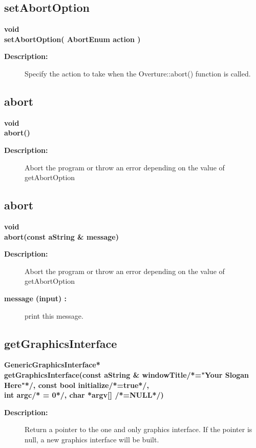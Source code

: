 \subsection{setAbortOption}
 
\begin{flushleft} \textbf{%
void  \\ 
\settowidth{\OvertureIncludeArgIndent}{setAbortOption(}%
setAbortOption( AbortEnum action )
}\end{flushleft}
\begin{description}
\item[{\bf Description:}] 
    Specify the action to take when the Overture::abort() function is called.
\end{description}
\subsection{abort}
 
\begin{flushleft} \textbf{%
void  \\ 
\settowidth{\OvertureIncludeArgIndent}{abort(}%
abort()
}\end{flushleft}
\begin{description}
\item[{\bf Description:}] 
    Abort the program or throw an error depending on the value of getAbortOption
\end{description}
\subsection{abort}
 
\begin{flushleft} \textbf{%
void  \\ 
\settowidth{\OvertureIncludeArgIndent}{abort(}%
abort(const aString \& message)
}\end{flushleft}
\begin{description}
\item[{\bf Description:}] 
    Abort the program or throw an error depending on the value of getAbortOption
\item[{\bf message (input) :}]  print this message.
\end{description}
\subsection{getGraphicsInterface}
 
\begin{flushleft} \textbf{%
GenericGraphicsInterface*  \\ 
\settowidth{\OvertureIncludeArgIndent}{getGraphicsInterface(}%
getGraphicsInterface(const aString \& windowTitle/*="Your Slogan Here"*/, const bool initialize/*=true*/,\\ 
\hspace{\OvertureIncludeArgIndent}int argc/* = 0*/, char *argv[] /*=NULL*/)
}\end{flushleft}
\begin{description}
\item[{\bf Description:}] 
   Return a pointer to the one and only graphics interface. If the pointer is null,
   a new graphics interface will be built.
\end{description}
